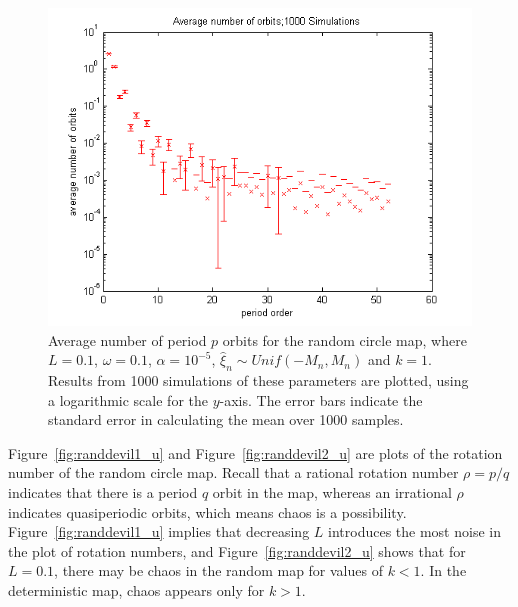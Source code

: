 \begin{figure}[H]\linespread{1}
\caption[Average number of period $p$ orbits for the random circle
map, $\alpha = 10^{-5}$]{Average number of period $p$ orbits for the random circle map,
  where $L=0.1$, $\omega =0.1$, $\alpha = 10^{-5}$, $\hat{\xi}_n\sim
  Unif(-M_n,M_n)$ and $k=1$. Results from 1000 simulations of these
  parameters are plotted, using a logarithmic scale for the
  $y$-axis. The error bars indicate the standard error in calculating the mean over 1000 samples.}\label{fig:avgcircorbs}
	\begin{center}
		\includegraphics[scale=0.65]{figs/rcirc_avg_num_1000_sim_logscale.png}
	\end{center}
\end{figure}


Figure~\ref{fig:randdevil1_u} and Figure~\ref{fig:randdevil2_u} are
plots of the rotation number of the random circle map. Recall that a
rational rotation number $\rho = p/q$ indicates that there is a period
$q$ orbit in the map, whereas an irrational $\rho$ indicates
quasiperiodic orbits, which means chaos is a
possibility. Figure~\ref{fig:randdevil1_u} implies that decreasing $L$
introduces the most noise in the plot of rotation numbers, and
Figure~\ref{fig:randdevil2_u} shows that for $L=0.1$, there may be
chaos in the random map for values of $k<1$. In the deterministic map,
chaos appears only for $k>1$.

